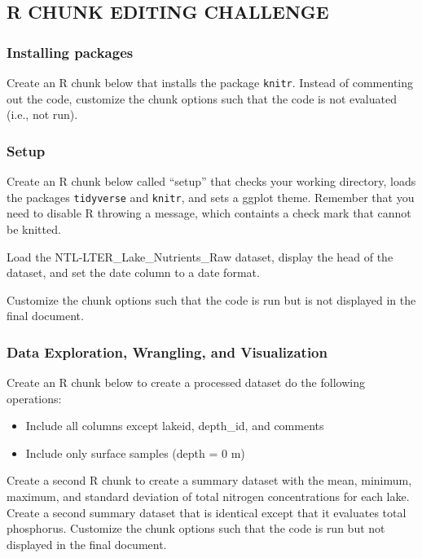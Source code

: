 \documentclass[]{article}
\providecommand{\tightlist}{%
  \setlength{\itemsep}{0pt}\setlength{\parskip}{0pt}}
\begin{document}
\hypertarget{r-chunk-editing-challenge}{%
\subsection{R CHUNK EDITING CHALLENGE}\label{r-chunk-editing-challenge}}

\hypertarget{installing-packages}{%
\subsubsection{Installing packages}\label{installing-packages}}

Create an R chunk below that installs the package \texttt{knitr}.
Instead of commenting out the code, customize the chunk options such
that the code is not evaluated (i.e., not run).

\hypertarget{setup}{%
\subsubsection{Setup}\label{setup}}

Create an R chunk below called ``setup'' that checks your working
directory, loads the packages \texttt{tidyverse} and \texttt{knitr}, and
sets a ggplot theme. Remember that you need to disable R throwing a
message, which containts a check mark that cannot be knitted.

Load the NTL-LTER\_Lake\_Nutrients\_Raw dataset, display the head of the
dataset, and set the date column to a date format.

Customize the chunk options such that the code is run but is not
displayed in the final document.

\hypertarget{data-exploration-wrangling-and-visualization}{%
\subsubsection{Data Exploration, Wrangling, and
Visualization}\label{data-exploration-wrangling-and-visualization}}

Create an R chunk below to create a processed dataset do the following
operations:

\begin{itemize}
\tightlist
\item
  Include all columns except lakeid, depth\_id, and comments
\item
  Include only surface samples (depth = 0 m)
\end{itemize}

Create a second R chunk to create a summary dataset with the mean,
minimum, maximum, and standard deviation of total nitrogen
concentrations for each lake. Create a second summary dataset that is
identical except that it evaluates total phosphorus. Customize the chunk
options such that the code is run but not displayed in the final
document.
\end{document}
